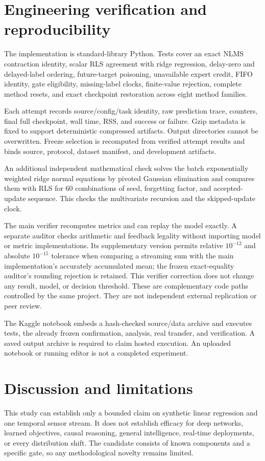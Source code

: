 \documentclass[10pt]{article}
\begin{document}
\section{Engineering verification and reproducibility}
The implementation is standard-library Python. Tests cover an exact NLMS contraction identity, scalar RLS agreement with ridge regression, delay-zero and delayed-label ordering, future-target poisoning, unavailable expert credit, FIFO identity, gate eligibility, missing-label clocks, finite-value rejection, complete method resets, and exact checkpoint restoration across eight method families.

Each attempt records source/config/task identity, raw prediction trace, counters, final full checkpoint, wall time, RSS, and success or failure. Gzip metadata is fixed to support deterministic compressed artifacts. Output directories cannot be overwritten. Freeze selection is recomputed from verified attempt results and binds source, protocol, dataset manifest, and development artifacts.

An additional independent mathematical check solves the batch exponentially weighted ridge normal equations by pivoted Gaussian elimination and compares them with RLS for 60 combinations of seed, forgetting factor, and accepted-update sequence. This checks the multivariate recursion and the skipped-update clock.

The main verifier recomputes metrics and can replay the model exactly. A separate auditor checks arithmetic and feedback legality without importing model or metric implementations. Its supplementary version permits relative $10^{-12}$ and absolute $10^{-15}$ tolerance when comparing a streaming sum with the main implementation's accurately accumulated mean; the frozen exact-equality auditor's rounding rejection is retained. This verifier correction does not change any result, model, or decision threshold. These are complementary code paths controlled by the same project. They are not independent external replication or peer review.

The Kaggle notebook embeds a hash-checked source/data archive and executes tests, the already frozen confirmation, analysis, real transfer, and verification. A saved output archive is required to claim hosted execution. An uploaded notebook or running editor is not a completed experiment.

\section{Discussion and limitations}
This study can establish only a bounded claim on synthetic linear regression and one temporal sensor stream. It does not establish efficacy for deep networks, learned objectives, causal reasoning, general intelligence, real-time deployments, or every distribution shift. The candidate consists of known components and a specific gate, so any methodological novelty remains limited.
\end{document}
